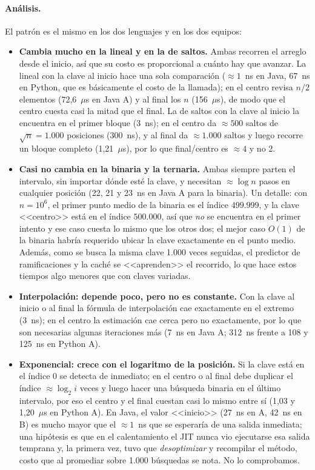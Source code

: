 \documentclass[11pt,a4paper]{article}
\begin{document}
\paragraph{An\'alisis.} El patr\'on es el mismo en los dos lenguajes y en los dos equipos:
\begin{itemize}
  \item \textbf{Cambia mucho en la lineal y en la de saltos.} Ambas recorren el arreglo desde el inicio, as\'i
  que su costo es proporcional a cu\'anto hay que avanzar. La lineal con la clave al inicio hace una sola
  comparaci\'on ($\approx1$~ns en Java, 67~ns en Python, que es b\'asicamente el costo de la llamada); en el
  centro revisa $n/2$ elementos (72,6~$\mu$s en Java A) y al final los $n$ (156~$\mu$s), de modo que el centro
  cuesta casi la mitad que el final. La de saltos con la clave al inicio la encuentra en el primer bloque
  (3~ns); en el centro da $\approx500$ saltos de $\sqrt n=1.000$ posiciones (300~ns), y al final da $\approx1.000$
  saltos y luego recorre un bloque completo (1,21~$\mu$s), por lo que final/centro es $\approx4$ y no 2.
  \item \textbf{Casi no cambia en la binaria y la ternaria.} Ambas siempre parten el intervalo, sin importar
  d\'onde est\'e la clave, y necesitan $\approx\log n$ pasos en cualquier posici\'on (22, 21 y 23~ns en Java A
  para la binaria). Un detalle: con $n=10^6$, el primer punto medio de la binaria es el \'indice $499.999$, y
  la clave <<centro>> est\'a en el \'indice $500.000$, as\'i que \emph{no} se encuentra en el primer intento y
  ese caso cuesta lo mismo que los otros dos; el mejor caso $O(1)$ de la binaria habr\'ia requerido ubicar la
  clave exactamente en el punto medio. Adem\'as, como se busca la misma clave 1.000 veces seguidas, el
  predictor de ramificaciones y la cach\'e se <<aprenden>> el recorrido, lo que hace estos tiempos algo
  menores que con claves variadas.
  \item \textbf{Interpolaci\'on: depende poco, pero no es constante.} Con la clave al inicio o al final la
  f\'ormula de interpolaci\'on cae exactamente en el extremo (3~ns); en el centro la estimaci\'on cae cerca pero
  no exactamente, por lo que son necesarias algunas iteraciones m\'as (7~ns en Java A; 312~ns frente a 108 y
  125~ns en Python A).
  \item \textbf{Exponencial: crece con el logaritmo de la posici\'on.} Si la clave est\'a en el \'indice 0 se
  detecta de inmediato; en el centro o al final debe duplicar el \'indice $\approx\log_2 i$ veces y luego hacer
  una b\'usqueda binaria en el \'ultimo intervalo, por eso el centro y el final cuestan casi lo mismo entre s\'i
  (1,03 y 1,20~$\mu$s en Python A). En Java, el valor <<inicio>> (27~ns en A, 42~ns en B) es mucho mayor que el
  $\approx1$~ns que se esperar\'ia de una salida inmediata; una hip\'otesis es que en el calentamiento el JIT
  nunca vio ejecutarse esa salida temprana y, la primera vez, tuvo que \emph{desoptimizar} y recompilar el
  m\'etodo, costo que al promediar sobre 1.000 b\'usquedas se nota. No lo comprobamos.
\end{itemize}
\end{document}
